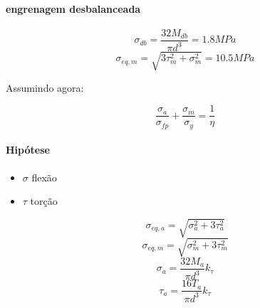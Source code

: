 \paragraph*{engrenagem desbalanceada}

\[\sigma _{db}=\frac{32M_{db}}{\pi d^{3}}=1.8 MPa\]
\[\sigma _{eq,m}=\sqrt{3\tau _{m}^{2}+\sigma _{m}^{2}}=10.5 MPa\]





\newpage

Assumindo agora:

\[\frac{\sigma _{a}}{\sigma _{fp}}+\frac{\sigma _{m}}{\sigma _{y}}=\frac{1}{\eta}\]

\paragraph*{Hipótese}
\begin{itemize}
\item $\sigma$ flexão
\item $\tau$ torção
\end{itemize}



\[\sigma _{eq,a} = \sqrt{\sigma _{a}^{2}+3\tau _{a}^{2}}\]
\[\sigma _{eq,m} = \sqrt{\sigma _{m}^{2}+3\tau _{m}^{2}}\]
\[\sigma _{a}=\frac{32M_{a}}{\pi d^{3}}k_{\tau}\]
\[\tau _{a}=\frac{16T_{a}}{\pi d^{3}}k_{\tau}\]

